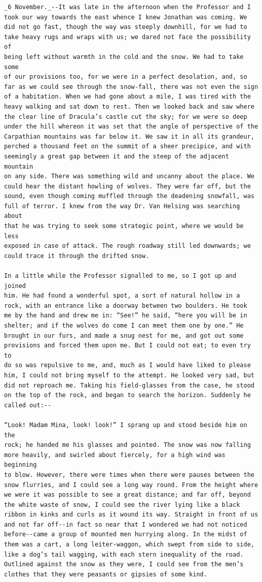 \documentclass{article}
\begin{document}
\begin{verbatim}
_6 November._--It was late in the afternoon when the Professor and I
took our way towards the east whence I knew Jonathan was coming. We
did not go fast, though the way was steeply downhill, for we had to
take heavy rugs and wraps with us; we dared not face the possibility of
being left without warmth in the cold and the snow. We had to take some
of our provisions too, for we were in a perfect desolation, and, so
far as we could see through the snow-fall, there was not even the sign
of a habitation. When we had gone about a mile, I was tired with the
heavy walking and sat down to rest. Then we looked back and saw where
the clear line of Dracula’s castle cut the sky; for we were so deep
under the hill whereon it was set that the angle of perspective of the
Carpathian mountains was far below it. We saw it in all its grandeur,
perched a thousand feet on the summit of a sheer precipice, and with
seemingly a great gap between it and the steep of the adjacent mountain
on any side. There was something wild and uncanny about the place. We
could hear the distant howling of wolves. They were far off, but the
sound, even though coming muffled through the deadening snowfall, was
full of terror. I knew from the way Dr. Van Helsing was searching about
that he was trying to seek some strategic point, where we would be less
exposed in case of attack. The rough roadway still led downwards; we
could trace it through the drifted snow.

In a little while the Professor signalled to me, so I got up and joined
him. He had found a wonderful spot, a sort of natural hollow in a
rock, with an entrance like a doorway between two boulders. He took
me by the hand and drew me in: “See!” he said, “here you will be in
shelter; and if the wolves do come I can meet them one by one.” He
brought in our furs, and made a snug nest for me, and got out some
provisions and forced them upon me. But I could not eat; to even try to
do so was repulsive to me, and, much as I would have liked to please
him, I could not bring myself to the attempt. He looked very sad, but
did not reproach me. Taking his field-glasses from the case, he stood
on the top of the rock, and began to search the horizon. Suddenly he
called out:--

“Look! Madam Mina, look! look!” I sprang up and stood beside him on the
rock; he handed me his glasses and pointed. The snow was now falling
more heavily, and swirled about fiercely, for a high wind was beginning
to blow. However, there were times when there were pauses between the
snow flurries, and I could see a long way round. From the height where
we were it was possible to see a great distance; and far off, beyond
the white waste of snow, I could see the river lying like a black
ribbon in kinks and curls as it wound its way. Straight in front of us
and not far off--in fact so near that I wondered we had not noticed
before--came a group of mounted men hurrying along. In the midst of
them was a cart, a long leiter-waggon, which swept from side to side,
like a dog’s tail wagging, with each stern inequality of the road.
Outlined against the snow as they were, I could see from the men’s
clothes that they were peasants or gipsies of some kind.


\end{verbatim}
\end{document}
